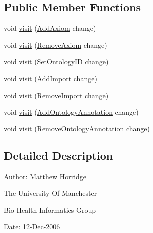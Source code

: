 \subsection*{Public Member Functions}
\begin{DoxyCompactItemize}
\item 
void \hyperlink{interfaceorg_1_1semanticweb_1_1owlapi_1_1model_1_1_o_w_l_ontology_change_visitor_ad2d64ccf235b233e9bd19de14b0084d4}{visit} (\hyperlink{classorg_1_1semanticweb_1_1owlapi_1_1model_1_1_add_axiom}{Add\-Axiom} change)
\item 
void \hyperlink{interfaceorg_1_1semanticweb_1_1owlapi_1_1model_1_1_o_w_l_ontology_change_visitor_a51316d95c1ba2a2d83573671bd6cf5fe}{visit} (\hyperlink{classorg_1_1semanticweb_1_1owlapi_1_1model_1_1_remove_axiom}{Remove\-Axiom} change)
\item 
void \hyperlink{interfaceorg_1_1semanticweb_1_1owlapi_1_1model_1_1_o_w_l_ontology_change_visitor_a469baae85925cbe35d1f171765bbe47e}{visit} (\hyperlink{classorg_1_1semanticweb_1_1owlapi_1_1model_1_1_set_ontology_i_d}{Set\-Ontology\-I\-D} change)
\item 
void \hyperlink{interfaceorg_1_1semanticweb_1_1owlapi_1_1model_1_1_o_w_l_ontology_change_visitor_ab2d4abfa6a57cf0f1800626a0853843f}{visit} (\hyperlink{classorg_1_1semanticweb_1_1owlapi_1_1model_1_1_add_import}{Add\-Import} change)
\item 
void \hyperlink{interfaceorg_1_1semanticweb_1_1owlapi_1_1model_1_1_o_w_l_ontology_change_visitor_a17eda85ca5b7d0e1b83f20d813bddfd9}{visit} (\hyperlink{classorg_1_1semanticweb_1_1owlapi_1_1model_1_1_remove_import}{Remove\-Import} change)
\item 
void \hyperlink{interfaceorg_1_1semanticweb_1_1owlapi_1_1model_1_1_o_w_l_ontology_change_visitor_ad6cfac4414241c197f6a0a9358700997}{visit} (\hyperlink{classorg_1_1semanticweb_1_1owlapi_1_1model_1_1_add_ontology_annotation}{Add\-Ontology\-Annotation} change)
\item 
void \hyperlink{interfaceorg_1_1semanticweb_1_1owlapi_1_1model_1_1_o_w_l_ontology_change_visitor_a6e340a6a8bd8c8e53ec8326a605358aa}{visit} (\hyperlink{classorg_1_1semanticweb_1_1owlapi_1_1model_1_1_remove_ontology_annotation}{Remove\-Ontology\-Annotation} change)
\end{DoxyCompactItemize}


\subsection{Detailed Description}
Author\-: Matthew Horridge\par
 The University Of Manchester\par
 Bio-\/\-Health Informatics Group\par
 Date\-: 12-\/\-Dec-\/2006\par
\par
 

